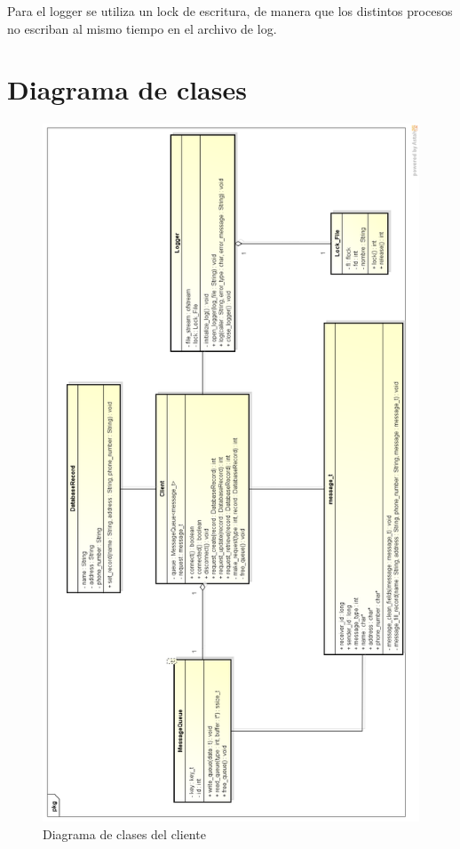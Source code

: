 \documentclass[11pt,spanish,a4paper,openany,notitlepage]{article}
\begin{document}
Para el logger se utiliza un lock de escritura, de manera que los distintos procesos no escriban al mismo tiempo en el archivo de log.

\newpage

\section{Diagrama de clases}

\begin{figure}[H]
\begin{center}
\includegraphics[width=360pt]{clases_cliente.png}
\caption{Diagrama de clases del cliente}
\end{center}
\end{figure}
\end{document}
